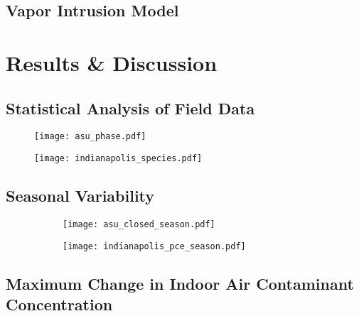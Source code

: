 \documentclass[journal=esthag,manuscript=article]{achemso}
\begin{document}
\subsection{Vapor Intrusion Model}



\section{Results \& Discussion}

\subsection{Statistical Analysis of Field Data}



\begin{figure}[!h]
	\centering
	\begin{minipage}[c]{0.49\textwidth}
		\centering
    \caption{ }
    \label{fig:asu_phase}
    \texttt{[image: asu\_phase.pdf]}
	\end{minipage}
	\begin{minipage}[c]{0.49\textwidth}
		\centering
    \caption{ }
    \label{fig:indianapolis_species}
    \texttt{[image: indianapolis\_species.pdf]}
	\end{minipage}
\end{figure}


\subsection{Seasonal Variability}

\begin{figure}[htb!]
  \caption{ }
  \label{fig:seasonal_analysis}
  \begin{subfigure}{0.49\textwidth}
    \centering
    \caption{ }
    \label{fig:seasonal_analysis_asu}
    \texttt{[image: asu\_closed\_season.pdf]}
  \end{subfigure}
  \begin{subfigure}{0.49\textwidth}
    \centering
    \caption{ }
    \label{fig:seasonal_analysis_indianapolis}
    \texttt{[image: indianapolis\_pce\_season.pdf]}
  \end{subfigure}
\end{figure}

\subsection{Maximum Change in Indoor Air Contaminant Concentration}
\end{document}
